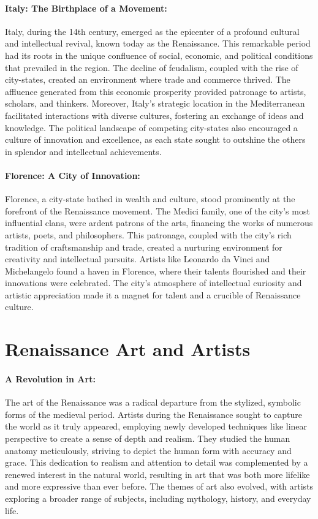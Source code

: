 \documentclass[a4paper,12pt]{book}
\begin{document}
\paragraph{Italy: The Birthplace of a Movement:}
Italy, during the 14th century, emerged as the epicenter of a profound cultural and intellectual revival, known today as the Renaissance. This remarkable period had its roots in the unique confluence of social, economic, and political conditions that prevailed in the region. The decline of feudalism, coupled with the rise of city-states, created an environment where trade and commerce thrived. The affluence generated from this economic prosperity provided patronage to artists, scholars, and thinkers. Moreover, Italy's strategic location in the Mediterranean facilitated interactions with diverse cultures, fostering an exchange of ideas and knowledge. The political landscape of competing city-states also encouraged a culture of innovation and excellence, as each state sought to outshine the others in splendor and intellectual achievements.

\paragraph{Florence: A City of Innovation:}
Florence, a city-state bathed in wealth and culture, stood prominently at the forefront of the Renaissance movement. The Medici family, one of the city’s most influential clans, were ardent patrons of the arts, financing the works of numerous artists, poets, and philosophers. This patronage, coupled with the city’s rich tradition of craftsmanship and trade, created a nurturing environment for creativity and intellectual pursuits. Artists like Leonardo da Vinci and Michelangelo found a haven in Florence, where their talents flourished and their innovations were celebrated. The city’s atmosphere of intellectual curiosity and artistic appreciation made it a magnet for talent and a crucible of Renaissance culture.

\section*{Renaissance Art and Artists}

\paragraph{A Revolution in Art:}
The art of the Renaissance was a radical departure from the stylized, symbolic forms of the medieval period. Artists during the Renaissance sought to capture the world as it truly appeared, employing newly developed techniques like linear perspective to create a sense of depth and realism. They studied the human anatomy meticulously, striving to depict the human form with accuracy and grace. This dedication to realism and attention to detail was complemented by a renewed interest in the natural world, resulting in art that was both more lifelike and more expressive than ever before. The themes of art also evolved, with artists exploring a broader range of subjects, including mythology, history, and everyday life.
\end{document}
